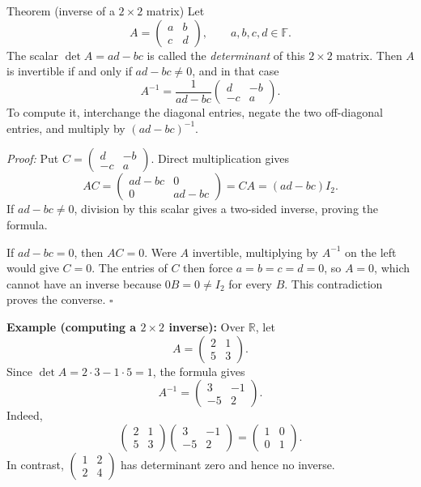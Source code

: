 \documentclass[a4paper,11pt,abstract=true]{scrartcl}
\theoremstyle{dotlessP}
\theoremstyle{dotlessS}
\theoremstyle{remark}
\theoremstyle{definition}
\begin{document}
\begin{mainbox}{Theorem (inverse of a $2\times2$ matrix)}
Let
\[
A=\begin{pmatrix}a&b\\c&d\end{pmatrix},\qquad a,b,c,d\in\mathbb{F}.
\]
The scalar $\det A=ad-bc$ is called the \emph{determinant} of this
$2\times2$ matrix. Then $A$ is invertible if and only if $ad-bc\neq0$,
and in that case
\[
\boxed{A^{-1}=\frac{1}{ad-bc}\begin{pmatrix}d&-b\\-c&a\end{pmatrix}.}
\]
To compute it, interchange the diagonal entries, negate the two
off-diagonal entries, and multiply by ${(ad-bc)}^{-1}$.
\end{mainbox}

\begin{claim_box}
\textit{Proof:} Put $C=\begin{pmatrix}d&-b\\-c&a\end{pmatrix}$.
Direct multiplication gives
\[
AC=\begin{pmatrix}ad-bc&0\\0&ad-bc\end{pmatrix}
=CA=(ad-bc)I_2.
\]
If $ad-bc\neq0$, division by this scalar gives a two-sided inverse,
proving the formula.

If $ad-bc=0$, then $AC=0$. Were $A$ invertible, multiplying by
$A^{-1}$ on the left would give $C=0$. The entries of $C$ then force
$a=b=c=d=0$, so $A=0$, which cannot have an inverse because $0B=0\neq I_2$
for every $B$. This contradiction proves the converse. \hfill$\square$
\end{claim_box}

\begin{example_box}
\textbf{Example (computing a $2\times2$ inverse):} Over
$\mathbb{R}$, let
\[
A=\begin{pmatrix}2&1\\5&3\end{pmatrix}.
\]
Since $\det A=2\cdot3-1\cdot5=1$, the formula gives
\[
A^{-1}=\begin{pmatrix}3&-1\\-5&2\end{pmatrix}.
\]
Indeed,
\[
\begin{pmatrix}2&1\\5&3\end{pmatrix}
\begin{pmatrix}3&-1\\-5&2\end{pmatrix}
=\begin{pmatrix}1&0\\0&1\end{pmatrix}.
\]
In contrast, $\begin{pmatrix}1&2\\2&4\end{pmatrix}$ has determinant
zero and hence no inverse.
\end{example_box}
\end{document}
